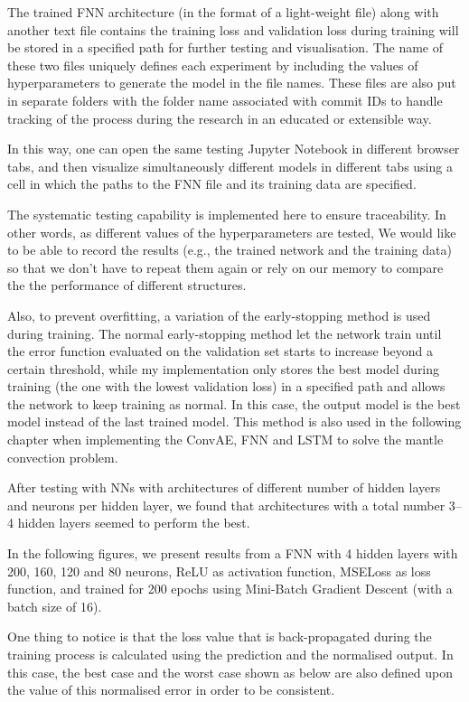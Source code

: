 The trained FNN architecture (in the format of a light-weight file) along with another text file contains the training loss and validation loss during training will be stored in a specified path for further testing and visualisation. The name of these two files uniquely defines each experiment by including the values of hyperparameters to generate the model in the file names. These files are also put in separate folders with the folder name associated with commit IDs to handle tracking of the process during the research in an educated or extensible way.

In this way, one can open the same testing Jupyter Notebook in different browser tabs, and then visualize simultaneously different models in different tabs using a cell in which the paths to the FNN file and its training data are specified. 

The systematic testing capability is implemented here to ensure traceability. In other words, as different values of the hyperparameters are tested, We would like to be able to record the results (e.g., the trained network and the training data) so that we don't have to repeat them again or rely on our memory to compare the the performance of different structures.

Also, to prevent overfitting, a variation of the early-stopping method is used during training. The normal early-stopping method let the network train until the error function evaluated on the validation set starts to increase beyond a certain threshold\citep{10.1007_978-3-642-35289-8_5}, while my implementation only stores the best model during training (the one with the lowest validation loss) in a specified path and allows the network to keep training as normal. In this case, the output model is the best model instead of the last trained model. This method is also used in the following chapter when implementing the ConvAE, FNN and LSTM to solve the mantle convection problem.

After testing with NNs with architectures of different number of hidden layers and neurons per hidden layer, we found that architectures with a total number 3–4 hidden layers seemed to perform the best.

In the following figures, we present results from a FNN with 4 hidden layers with 200, 160, 120 and 80 neurons, ReLU as activation function, MSELoss as loss function, and trained for 200 epochs using Mini-Batch Gradient Descent (with a batch size of 16).

One thing to notice is that the loss value that is back-propagated during the training process is calculated using the prediction and the normalised output. In this case, the best case and the worst case shown as below are also defined upon the value of this normalised error in order to be consistent.

